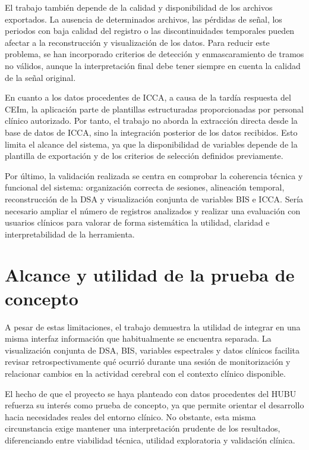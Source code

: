 \documentclass[
  spanish,
  a4paper,
  12pt,
  twoside]{memoir}
\begin{document}
El trabajo también depende de la calidad y disponibilidad de los
archivos exportados. La ausencia de determinados archivos, las pérdidas
de señal, los periodos con baja calidad del registro o las
discontinuidades temporales pueden afectar a la reconstrucción y
visualización de los datos. Para reducir este problema, se han
incorporado criterios de detección y enmascaramiento de tramos no
válidos, aunque la interpretación final debe tener siempre en cuenta la
calidad de la señal original.

En cuanto a los datos procedentes de ICCA, a causa de la tardía
respuesta del CEIm, la aplicación parte de plantillas estructuradas
proporcionadas por personal clínico autorizado. Por tanto, el trabajo no
aborda la extracción directa desde la base de datos de ICCA, sino la
integración posterior de los datos recibidos. Esto limita el alcance del
sistema, ya que la disponibilidad de variables depende de la plantilla
de exportación y de los criterios de selección definidos previamente.

Por último, la validación realizada se centra en comprobar la coherencia
técnica y funcional del sistema: organización correcta de sesiones,
alineación temporal, reconstrucción de la DSA y visualización conjunta
de variables BIS e ICCA. Sería necesario ampliar el número de registros
analizados y realizar una evaluación con usuarios clínicos para valorar
de forma sistemática la utilidad, claridad e interpretabilidad de la
herramienta.

\section{Alcance y utilidad de la prueba de
concepto}\label{alcance-y-utilidad-de-la-prueba-de-concepto}

A pesar de estas limitaciones, el trabajo demuestra la utilidad de
integrar en una misma interfaz información que habitualmente se
encuentra separada. La visualización conjunta de DSA, BIS, variables
espectrales y datos clínicos facilita revisar retrospectivamente qué
ocurrió durante una sesión de monitorización y relacionar cambios en la
actividad cerebral con el contexto clínico disponible.

El hecho de que el proyecto se haya planteado con datos procedentes del
HUBU refuerza su interés como prueba de concepto, ya que permite
orientar el desarrollo hacia necesidades reales del entorno clínico. No
obstante, esta misma circunstancia exige mantener una interpretación
prudente de los resultados, diferenciando entre viabilidad técnica,
utilidad exploratoria y validación clínica.
\end{document}
